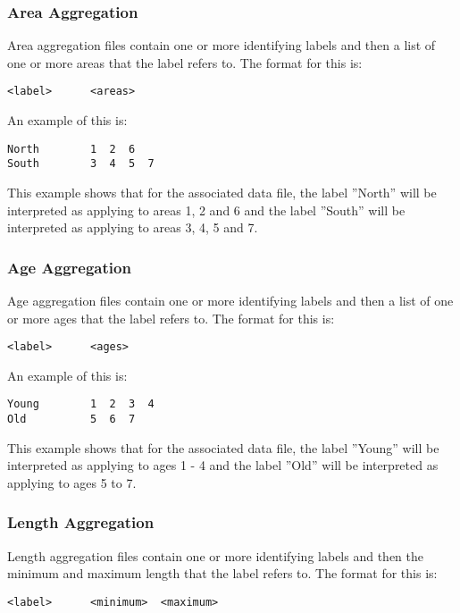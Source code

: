 \documentclass [a4paper, 10pt]{book}
\begin{document}
\subsubsection{Area Aggregation}
Area aggregation files contain one or more identifying labels and then a list of one or more areas that the label refers to.  The format for this is:

{\small\begin{verbatim}
<label>      <areas>
\end{verbatim}}

An example of this is:

{\small\begin{verbatim}
North        1  2  6
South        3  4  5  7
\end{verbatim}}

This example shows that for the associated data file, the label ''North'' will be interpreted as applying to areas 1, 2 and 6 and the label ''South'' will be interpreted as applying to areas 3, 4, 5 and 7.

\subsubsection{Age Aggregation}
Age aggregation files contain one or more identifying labels and then a list of one or more ages that the label refers to.  The format for this is:

{\small\begin{verbatim}
<label>      <ages>
\end{verbatim}}

An example of this is:

{\small\begin{verbatim}
Young        1  2  3  4
Old          5  6  7
\end{verbatim}}

This example shows that for the associated data file, the label ''Young'' will be interpreted as applying to ages 1 - 4 and the label ''Old'' will be interpreted as applying to ages 5 to 7.

\subsubsection{Length Aggregation}
Length aggregation files contain one or more identifying labels and then the minimum and maximum length that the label refers to.  The format for this is:

{\small\begin{verbatim}
<label>      <minimum>  <maximum>
\end{verbatim}}
\end{document}
